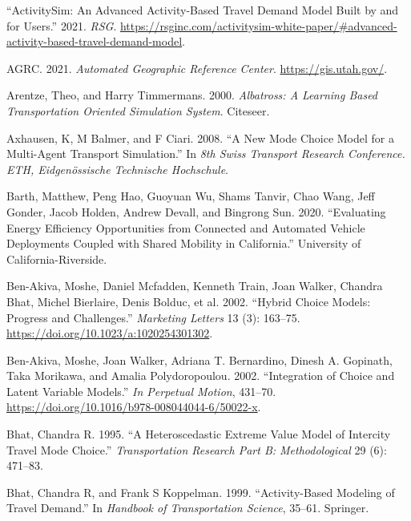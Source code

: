 \documentclass[12pt, oneside, openright]{byuthesis}
\newlength{\cslhangindent}
\newlength{\cslentryspacingunit} %
\newenvironment{CSLReferences}[2] %
 {%
  \setlength{\parindent}{0pt}
  \ifodd #1
  \let\oldpar\par
  \def\par{\hangindent=\cslhangindent\oldpar}
  \fi
  \setlength{\parskip}{#2\cslentryspacingunit}
 }%
 {}
\begin{document}
\hypertarget{refs}{}
\begin{CSLReferences}{1}{0}
\leavevmode{}%
{``ActivitySim: An Advanced Activity-Based Travel Demand Model Built by and for Users.''} 2021. \emph{RSG}. \url{https://rsginc.com/activitysim-white-paper/\#advanced-activity-based-travel-demand-model}.

\leavevmode{}%
AGRC. 2021. \emph{Automated Geographic Reference Center}. \url{https://gis.utah.gov/}.

\leavevmode{}%
Arentze, Theo, and Harry Timmermans. 2000. \emph{Albatross: A Learning Based Transportation Oriented Simulation System}. Citeseer.

\leavevmode{}%
Axhausen, K, M Balmer, and F Ciari. 2008. {``A New Mode Choice Model for a Multi-Agent Transport Simulation.''} In \emph{8th Swiss Transport Research Conference. ETH, Eidgen{ö}ssische Technische Hochschule}.

\leavevmode{}%
Barth, Matthew, Peng Hao, Guoyuan Wu, Shams Tanvir, Chao Wang, Jeff Gonder, Jacob Holden, Andrew Devall, and Bingrong Sun. 2020. {``Evaluating Energy Efficiency Opportunities from Connected and Automated Vehicle Deployments Coupled with Shared Mobility in California.''} University of California-Riverside.

\leavevmode{}%
Ben-Akiva, Moshe, Daniel Mcfadden, Kenneth Train, Joan Walker, Chandra Bhat, Michel Bierlaire, Denis Bolduc, et al. 2002. {``Hybrid Choice Models: Progress and Challenges.''} \emph{Marketing Letters} 13 (3): 163--75. \url{https://doi.org/10.1023/a:1020254301302}.

\leavevmode{}%
Ben-Akiva, Moshe, Joan Walker, Adriana T. Bernardino, Dinesh A. Gopinath, Taka Morikawa, and Amalia Polydoropoulou. 2002. {``Integration of Choice and Latent Variable Models.''} \emph{In Perpetual Motion}, 431--70. \url{https://doi.org/10.1016/b978-008044044-6/50022-x}.

\leavevmode{}%
Bhat, Chandra R. 1995. {``A Heteroscedastic Extreme Value Model of Intercity Travel Mode Choice.''} \emph{Transportation Research Part B: Methodological} 29 (6): 471--83.

\leavevmode{}%
Bhat, Chandra R, and Frank S Koppelman. 1999. {``Activity-Based Modeling of Travel Demand.''} In \emph{Handbook of Transportation Science}, 35--61. Springer.


\end{CSLReferences}
\end{document}

